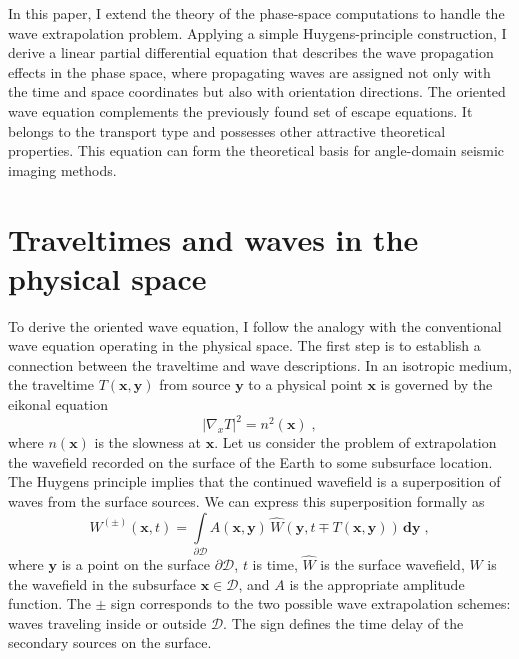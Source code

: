 In this paper, I extend the theory of the phase-space computations to handle
the wave extrapolation problem. Applying a simple Huygens-principle
construction, I derive a linear partial differential equation that describes
the wave propagation effects in the phase space, where propagating waves are
assigned not only with the time and space coordinates but also with
orientation directions. The oriented wave equation complements the previously
found set of escape equations. It belongs to the transport type and possesses
other attractive theoretical properties. This equation can form the
theoretical basis for angle-domain seismic imaging methods.

\section{Traveltimes and waves in the physical space}


To derive the oriented wave equation, I follow the analogy with the
conventional wave equation operating in the physical space. The first step is
to establish a connection between the traveltime and wave descriptions. In an
isotropic medium, the traveltime $T(\mathbf{x},\mathbf{y})$ from source
$\mathbf{y}$ to a physical point $\mathbf{x}$ is governed by the eikonal
equation
\begin{equation}
  \label{eq:eikonal}
  \left|\nabla_x T\right|^2 = n^2(\mathbf{x})\;, 
\end{equation}
where $n(\mathbf{x})$ is the slowness at $\mathbf{x}$. Let us consider the
problem of extrapolation the wavefield recorded on the surface of the Earth to
some subsurface location. The Huygens principle implies that the continued
wavefield is a superposition of waves from the surface sources. We can express
this superposition formally as
\begin{equation}
\label{eq:cont}
W^{(\pm)}(\mathbf{x},t) = \int\limits_{\partial \mathcal{D}} 
A(\mathbf{x},\mathbf{y})\,
\widehat{W}\left(\mathbf{y},t \mp T(\mathbf{x},\mathbf{y})\right)\,
\mathbf{d y}\;,
\end{equation}
where $\mathbf{y}$ is a point on the surface $\partial \mathcal{D}$, $t$ is
time, $\widehat{W}$ is the surface wavefield, $W$ is the wavefield in the
subsurface $\mathbf{x} \in \mathcal{D}$, and $A$ is the appropriate amplitude
function.  The $\pm$ sign corresponds to the two possible wave extrapolation
schemes: waves traveling inside or outside $\mathcal{D}$. The sign defines the
time delay of the secondary sources on the surface.

